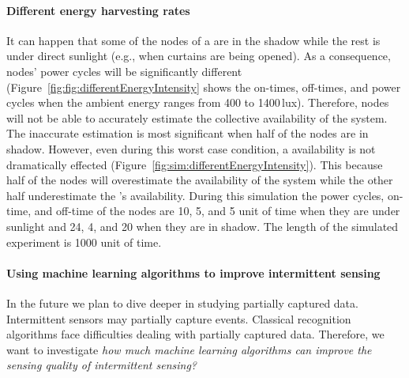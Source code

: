 \paragraph{Different energy harvesting rates}
It can happen that some of the nodes of a \cis are in the shadow while the rest is under direct sunlight (e.g., when curtains are being opened). 
As a consequence, nodes' power cycles will be significantly different (Figure~\ref{fig:fig:differentEnergyIntensity} shows the on-times, off-times, and power cycles when the ambient energy ranges from 400 to 1400\,lux). Therefore, nodes will not be able to accurately estimate the collective availability of the system. 
%
The inaccurate estimation is most significant when half of the nodes are in shadow. 
However, even during this worst case condition, a \cis availability is not dramatically effected (Figure~\ref{fig:sim:differentEnergyIntensity}). 
This because half of the nodes will overestimate the availability of the system while the other half underestimate the \cis's availability.
During this simulation the power cycles, on-time, and off-time of the nodes are 10, 5, and 5 unit of time when they are under sunlight and 24, 4, and 20 when they are in shadow. 
The length of the simulated experiment is 1000 unit of time.



\paragraph{Using machine learning algorithms to improve intermittent sensing}
In the future we plan to dive deeper in studying partially captured data. 
Intermittent sensors may partially capture events. Classical recognition 
algorithms face difficulties dealing with partially captured data. 
Therefore, we want to investigate \emph{how much machine learning algorithms 
can improve the sensing quality of intermittent sensing?} 